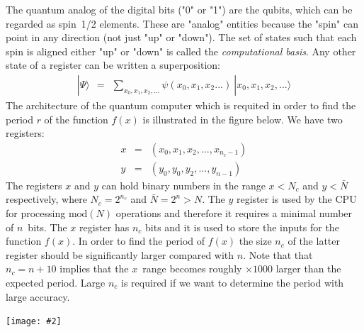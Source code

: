 \documentclass[onecolumn,fleqn, 11pt]{revtex4}
\newcommand{\putgraph}[2][0.30\hsize]{\texttt{[image: \#2]}}
\newcommand{\beq}{\begin{eqnarray}}
\newcommand{\eeq}{\end{eqnarray}}
\begin{document}
The quantum analog of the digital bits ("0" or "1") 
are the qubits, which can be regarded as spin~1/2 elements.
These are "analog" entities because the "spin" can point 
in any direction (not just "up" or "down").   
The set of states such that each spin is aligned 
either "up" or "down" is called the \textit{computational basis}. 
Any other state of a register can be written a superposition: 
\beq
|\Psi \rangle \ \ = \ \ \sum_{x_0,x_1,x_2,...} \psi(x_0,x_1,x_2...) \ |x_0,x_1,x_2,...\rangle
\eeq
The architecture of the quantum computer which is 
requited in order to find the period $r$ of the function $f(x)$ 
is illustrated in the figure below. We have two registers:
\beq
x &=& (x_0,x_1,x_2,...,x_{n_c-1}) \\
y &=& (y_0,y_0,y_2,...,y_{n-1})
\eeq
The registers $x$ and $y$ can hold binary numbers 
in the range ${x<N_c}$ and ${y<\bar{N}}$ respectively, 
where ${N_c=2^{n_c}}$ and ${\bar{N}=2^{n} > N}$.
The $y$ register is used by the CPU for processing $\mbox{mod}(N)$ 
operations and therefore it requires a minimal number of $n$~bits. 
The $x$ register has $n_c$ bits and it is used to store 
the inputs for the function $f(x)$.
In order to find the period of $f(x)$ the 
size $n_c$ of the latter register should be 
significantly larger compared with $n$.
Note that that ${n_c=n+10}$ implies that 
the $x$~range becomes roughly ${\times 1000}$ larger 
than the expected period. 
Large $n_c$ is required if we want 
to determine the period with large accuracy. 



\begin{center}
\putgraph[0.6\hsize]{QCScheme1}
\end{center}
\end{document}
